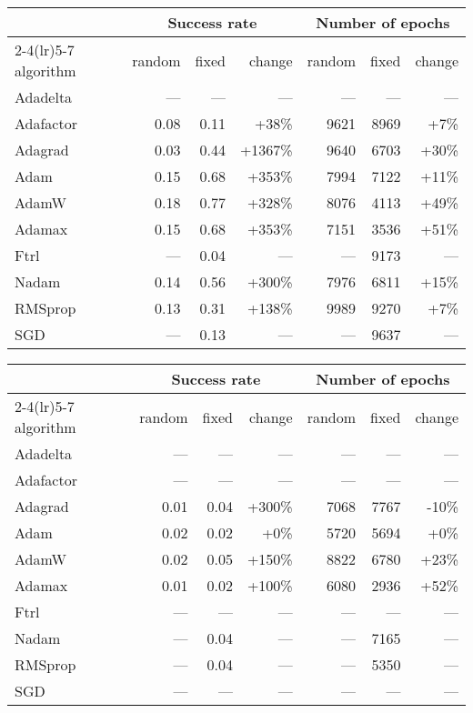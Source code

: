 \documentclass[letterpaper]{article} %
\begin{document}
\begin{table*}[t!]
    \centering\fontsize{8}{9.6}\selectfont
    \begin{tabular}{lrrrrrr}
        \toprule
        & \multicolumn{3}{c}{Success rate} & \multicolumn{3}{c}{Number of epochs}
        \\\cmidrule(lr){2-4}\cmidrule(lr){5-7}
        algorithm & random & fixed & change & random & fixed & change
        \\\midrule
        Adadelta & --- & --- & --- & --- & --- & ---
        \\
        Adafactor & 0.08 & 0.11 & +38\% & 9621 & 8969 & +7\%
        \\
        Adagrad & 0.03 & 0.44 & +1367\% & 9640 & 6703 & +30\%
        \\
        Adam & 0.15 & 0.68 & +353\% & 7994 & 7122 & +11\%
        \\
        AdamW & 0.18 & 0.77 & +328\% & 8076 & 4113 & +49\%
        \\
        Adamax & 0.15 & 0.68 & +353\% & 7151 & 3536 & +51\%
        \\
        Ftrl & --- & 0.04 & --- & --- & 9173 & ---
        \\
        Nadam & 0.14 & 0.56 & +300\% & 7976 & 6811 & +15\%
        \\
        RMSprop & 0.13 & 0.31 & +138\% & 9989 & 9270 & +7\%
        \\
        SGD & --- & 0.13 & --- & --- & 9637 & ---
        \\\bottomrule
    \end{tabular}
    \hfill
    \begin{tabular}{lrrrrrr}
        \toprule
        & \multicolumn{3}{c}{Success rate} & \multicolumn{3}{c}{Number of epochs}
        \\\cmidrule(lr){2-4}\cmidrule(lr){5-7}
        algorithm & random & fixed & change & random & fixed & change
        \\\midrule
        Adadelta & --- & --- & --- & --- & --- & ---
        \\
        Adafactor & --- & --- & --- & --- & --- & ---
        \\
        Adagrad & 0.01 & 0.04 & +300\% & 7068 & 7767 & -10\%
        \\
        Adam & 0.02 & 0.02 & +0\% & 5720 & 5694 & +0\%
        \\
        AdamW & 0.02 & 0.05 & +150\% & 8822 & 6780 & +23\%
        \\
        Adamax & 0.01 & 0.02 & +100\% & 6080 & 2936 & +52\%
        \\
        Ftrl & --- & --- & --- & --- & --- & ---
        \\
        Nadam & --- & 0.04 & --- & --- & 7165 & ---
        \\
        RMSprop & --- & 0.04 & --- & --- & 5350 & ---
        \\
        SGD & --- & --- & --- & --- & --- & ---
        \\\bottomrule
    \end{tabular}
    \caption{Results on 2-step Game of Life with sequential network and Tanh (left) / ReLU (right) activations.}
    \label{tab:2_step_seq}
\end{table*}
\end{document}
